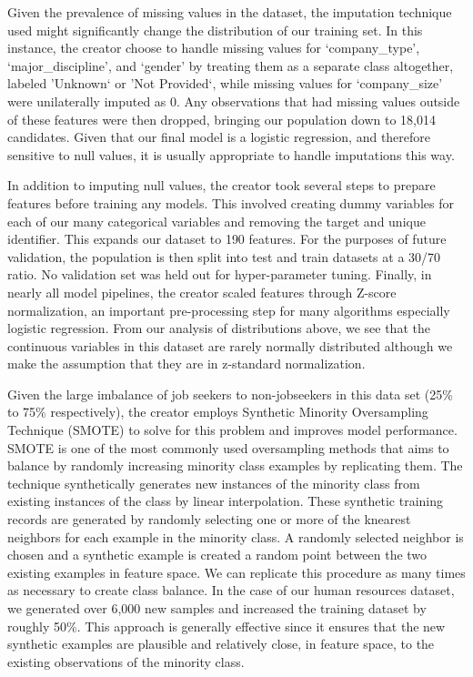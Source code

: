 Given the prevalence of missing values in the dataset, the imputation technique used might significantly change the distribution of our training set.  In this instance, the creator choose to handle missing values for `company\_type', `major\_discipline', and `gender' by treating them as a separate class altogether, labeled 'Unknown` or 'Not Provided`, while missing values for `company\_size' were unilaterally imputed as 0. Any observations that had missing values outside of these features were then dropped, bringing our population down to 18,014 candidates. Given that our final model is a logistic regression, and therefore sensitive to null values, it is usually appropriate to handle imputations this way.

In addition to imputing null values, the creator took several steps to prepare features before training any models.  This involved creating dummy variables for each of our many categorical variables and removing the target and unique identifier.  This expands our dataset to 190 features. For the purposes of future validation, the population is then split into test and train datasets at a 30/70 ratio.  No validation set was held out for hyper-parameter tuning.  Finally, in nearly all model pipelines, the creator scaled features through Z-score normalization, an important pre-processing step for many algorithms especially logistic regression.  From our analysis of distributions above, we see that the continuous variables in this dataset are rarely normally distributed although we make the assumption that they are in z-standard normalization.

Given the large imbalance of job seekers to non-jobseekers in this data set (25\% to 75\% respectively), the creator employs Synthetic Minority Oversampling Technique (SMOTE) to solve for this problem and improves model performance.  SMOTE is one of the most commonly used oversampling methods that aims to balance by randomly increasing minority class examples by replicating them. The technique synthetically generates new instances of the minority class from existing instances of the class by linear interpolation.  These synthetic training records are generated by randomly selecting one or more of the k\-nearest neighbors for each example in the minority class.  A randomly selected neighbor is chosen and a synthetic example is created a random point between the two existing examples in feature space.  We can replicate this procedure as many times as necessary to create class balance.  In the case of our human resources dataset, we generated over 6,000 new samples and increased the training dataset by roughly 50\%.
This approach is generally effective since it ensures that the new synthetic examples are plausible and relatively close, in feature space, to the existing observations of the minority class.  

